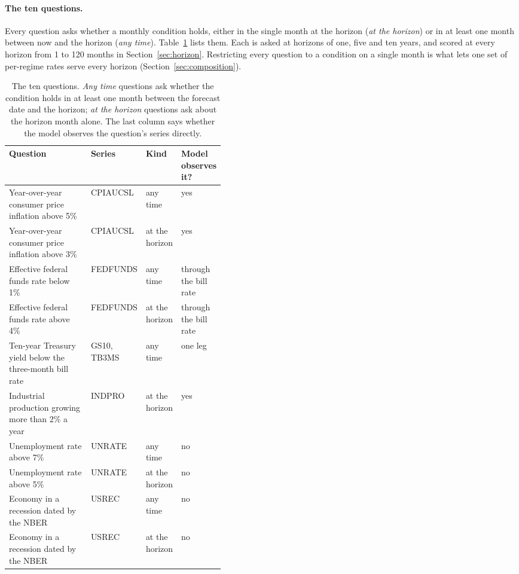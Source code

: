\documentclass[11pt]{article}
\begin{document}
\paragraph{The ten questions.} Every question asks whether a monthly condition holds, either in the
single month at the horizon (\emph{at the horizon}) or in at least one month between now and the horizon
(\emph{any time}). Table~\ref{tab:questions} lists them. Each is asked at horizons of one, five and ten
years, and scored at every horizon from 1 to 120 months in Section~\ref{sec:horizon}. Restricting every
question to a condition on a single month is what lets one set of per-regime rates serve every
horizon (Section~\ref{sec:composition}).

\begin{table}[t]
\centering
\caption{The ten questions. \emph{Any time} questions ask whether the condition holds in at least one
month between the forecast date and the horizon; \emph{at the horizon} questions ask about the horizon
month alone. The last column says whether the model observes the question's series directly.}
\label{tab:questions}
\small
\begin{tabular}{p{0.42\linewidth}lll}
\toprule
Question & Series & Kind & Model observes it? \\
\midrule
Year-over-year consumer price inflation above 5\% & CPIAUCSL & any time & yes \\
Year-over-year consumer price inflation above 3\% & CPIAUCSL & at the horizon & yes \\
Effective federal funds rate below 1\% & FEDFUNDS & any time & through the bill rate \\
Effective federal funds rate above 4\% & FEDFUNDS & at the horizon & through the bill rate \\
Ten-year Treasury yield below the three-month bill rate & GS10, TB3MS & any time & one leg \\
Industrial production growing more than 2\% a year & INDPRO & at the horizon & yes \\
Unemployment rate above 7\% & UNRATE & any time & no \\
Unemployment rate above 5\% & UNRATE & at the horizon & no \\
Economy in a recession dated by the NBER & USREC & any time & no \\
Economy in a recession dated by the NBER & USREC & at the horizon & no \\
\bottomrule
\end{tabular}
\end{table}
\end{document}
